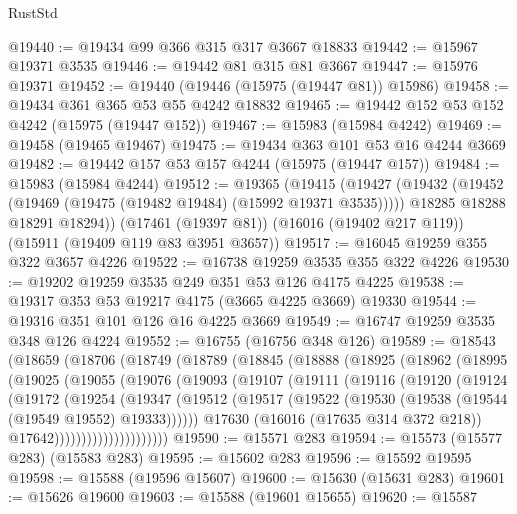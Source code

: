 \begin{lexlean}{RustStd}
\begin{coremodule}
@19440 := @19434 @99 @366 @315 @317 @3667 @18833
@19442 := @15967 @19371 @3535
@19446 := @19442 @81 @315 @81 @3667
@19447 := @15976 @19371
@19452 := @19440 (@19446 (@15975 (@19447 @81)) @15986)
@19458 := @19434 @361 @365 @53 @55 @4242 @18832
@19465 := @19442 @152 @53 @152 @4242 (@15975 (@19447 @152))
@19467 := @15983 (@15984 @4242)
@19469 := @19458 (@19465 @19467)
@19475 := @19434 @363 @101 @53 @16 @4244 @3669
@19482 := @19442 @157 @53 @157 @4244 (@15975 (@19447 @157))
@19484 := @15983 (@15984 @4244)
@19512 := @19365
    (@19415
      (@19427
        (@19432 (@19452 (@19469 (@19475 (@19482 @19484) (@15992 @19371 @3535)))))
        @18285
        @18288
        @18291
        @18294))
    (@17461 (@19397 @81))
    (@16016 (@19402 @217 @119))
    (@15911 (@19409 @119 @83 @3951 @3657))
@19517 := @16045 @19259 @355 @322 @3657 @4226
@19522 := @16738 @19259 @3535 @355 @322 @4226
@19530 := @19202 @19259 @3535 @249 @351 @53 @126 @4175 @4225
@19538 := @19317 @353 @53 @19217 @4175 (@3665 @4225 @3669) @19330
@19544 := @19316 @351 @101 @126 @16 @4225 @3669
@19549 := @16747 @19259 @3535 @348 @126 @4224
@19552 := @16755 (@16756 @348 @126)
@19589 := @18543
    (@18659
      (@18706
        (@18749
          (@18789
            (@18845
              (@18888
                (@18925
                  (@18962
                    (@18995
                      (@19025
                        (@19055
                          (@19076
                            (@19093
                              (@19107
                                (@19111
                                  (@19116
                                    (@19120
                                      (@19124
                                        (@19172
                                          (@19254
                                            (@19347
                                              (@19512
                                                (@19517
                                                  (@19522
                                                    (@19530
                                                      (@19538 (@19544 (@19549 @19552) @19333))))))
                                              @17630
                                              (@16016 (@17635 @314 @372 @218))
                                              @17642)))))))))))))))))))))
@19590 := @15571 @283
@19594 := @15573 (@15577 @283) (@15583 @283)
@19595 := @15602 @283
@19596 := @15592 @19595
@19598 := @15588 (@19596 @15607)
@19600 := @15630 (@15631 @283)
@19601 := @15626 @19600
@19603 := @15588 (@19601 @15655)
@19620 := @15587

\end{coremodule}
\end{lexlean}
